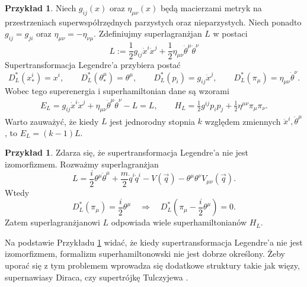 \documentclass[11pt,a4paper]{report}
\theoremstyle{definition}
\newtheorem{example}[theorem]{Przykład}
\begin{document}
\begin{example}
 Niech $g_{ij}(x)$ oraz $\eta_{\mu \nu}(x)$ będą macierzami metryk na przestrzeniach superwspółrzędnych parzystych oraz nieparzystych. Niech ponadto $g_{ij} = g_{ji}$ oraz $\eta_{\mu \nu} = - \eta_{\nu \mu}$. Zdefiniujmy superlagranżjan $L$ w postaci
 \begin{equation*}
  L:= \frac12 g_{ij} \dot x^i \dot x^j + \frac12 \eta_{\mu \nu} \dot \theta^\mu \dot \theta^\nu 
 \end{equation*}
 Supertransformacja Legendre'a przybiera postać
 \begin{equation*}
  D^*_L(x^i_*) = x^i, \qquad D^*_L (\theta^\mu_*) = \theta^\mu, \qquad D^*_L(p_i) = g_{ij} \dot x^j, \qquad D^*_L(\pi_\mu) = \eta_{\mu \nu} \dot \theta^\nu.
 \end{equation*}
 Wobec tego superenergia i superhamiltonian dane są wzorami
 \begin{equation*}
 \begin{gathered}
  E_L = g_{ij} \dot x^i \dot x^j + \eta_{\mu \nu} \dot \theta^\mu \dot \theta^\nu - L = L, \qquad
  H_L = \frac12 g^{ij} p_i p_j + \frac12 \eta^{\mu \nu} \pi_\mu \pi_\nu.
 \end{gathered}
 \end{equation*}
 Warto zauważyć, że kiedy $L$ jest jednorodny stopnia $k$ względem zmiennych $\dot x^i, \dot \theta^\mu$, to $E_L = (k-1)L$.
\end{example}

\begin{example}
\label{ex:irregular_legendre}
 Zdarza się, że supertransformacja Legendre'a nie jest izomorfizmem. Rozważmy superlagranżjan
 \begin{equation*}
  L = \frac{i}{2} \theta^\mu \dot{\theta}^\mu + \frac{m}{2} \dot{q}^i \dot{q}^i   - V(\overrightarrow{q}) - \theta^\mu \theta^\nu V_{\mu \nu} (\overrightarrow{q}).
 \end{equation*}
 Wtedy
 \begin{equation*}
  D^*_L (\pi_\mu) = \frac{i}{2} \theta^\mu \quad \Rightarrow \quad D^*_L (\pi_\mu - \frac{i}{2} \theta^\mu) = 0.
 \end{equation*}
 Zatem superlagranżjanowi $L$ odpowiada wiele superhamiltonianów $H_L$.
\end{example}

Na podstawie Przykładu \ref{ex:irregular_legendre} widać, że kiedy supertransformacja Legendre'a nie jest izomorfizmem, formalizm superhamiltonowski nie jest dobrze określony. Żeby uporać się z tym problemem wprowadza się dodatkowe struktury takie jak więzy, supernawiasy Diraca, czy supertrójkę Tulczyjewa \cite{cattaneo, grabowski}.
\end{document}
